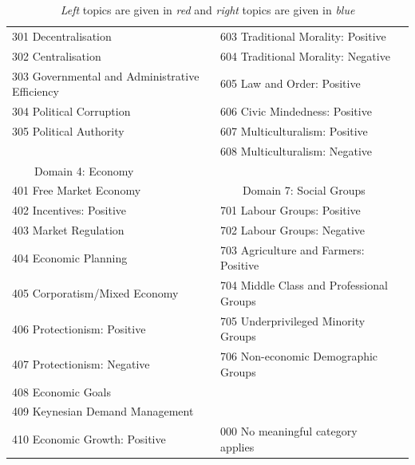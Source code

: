 \documentclass[11pt,a4paper]{article}
\newcommand{\tabitem}{~~\llap{\textbullet}~~}
\begin{document}
\begin{small}
\begin{table}
\begin{tabular}{lll}
\\
  301 Decentralisation & \color{blue}  603 Traditional Morality: Positive
\\
  302 Centralisation &   604 Traditional Morality: Negative
\\
  303 Governmental and Administrative Efficiency &  \color{blue}  605 Law and Order: Positive
\\
  304 Political Corruption &  \color{blue} 606 Civic Mindedness: Positive
\\
  \color{blue} 305 Political Authority &   607 Multiculturalism: Positive
\\
&   608 Multiculturalism: Negative\\
\tabitem Domain 4: Economy  & \\
 \color{blue} 401 Free Market Economy & \tabitem Domain 7: Social Groups\\
 \color{blue} 402 Incentives: Positive & \color{red} 701 Labour Groups: Positive\\
\color{red}  403 Market Regulation & 702 Labour Groups: Negative\\
\color{red}  404 Economic Planning & 703 Agriculture and Farmers: Positive\\
  405 Corporatism/Mixed Economy & 704 Middle Class and Professional Groups\\
\color{red}  406 Protectionism: Positive & 705 Underprivileged Minority Groups\\
\color{blue}  407 Protectionism: Negative & 706 Non-economic Demographic Groups\\
  408 Economic Goals & \\
  409 Keynesian Demand Management & \\
  410 Economic Growth: Positive & 000 No meaningful category applies\\
    \bottomrule   
  \end{tabular}
  \caption{\textit{Left} topics are given in \textit{\color{red}red} and \textit{right} topics are given in \textit{\color{blue}blue}}
  \label{fig:CMP}
\end{table}
\end{small}



\end{document}
